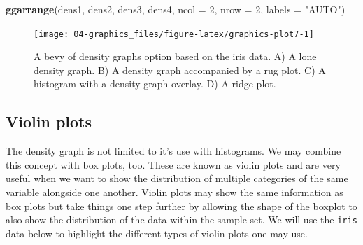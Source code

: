 \documentclass[english,10pt,a4paper,oneside]{book}
\newenvironment{Shaded}{\begin{snugshade}}{\end{snugshade}}
\newcommand{\KeywordTok}[1]{\textcolor[rgb]{0.13,0.29,0.53}{\textbf{#1}}}
\newcommand{\DataTypeTok}[1]{\textcolor[rgb]{0.13,0.29,0.53}{#1}}
\newcommand{\DecValTok}[1]{\textcolor[rgb]{0.00,0.00,0.81}{#1}}
\newcommand{\StringTok}[1]{\textcolor[rgb]{0.31,0.60,0.02}{#1}}
\newcommand{\NormalTok}[1]{#1}
\theoremstyle{definition}
\theoremstyle{definition}
\theoremstyle{definition}
\theoremstyle{remark}
\begin{document}
\begin{Shaded}
\begin{Highlighting}[]
\KeywordTok{ggarrange}\NormalTok{(dens1, dens2, dens3, dens4, }\DataTypeTok{ncol =} \DecValTok{2}\NormalTok{, }\DataTypeTok{nrow =} \DecValTok{2}\NormalTok{, }\DataTypeTok{labels =} \StringTok{"AUTO"}\NormalTok{)}
\end{Highlighting}
\end{Shaded}

\begin{figure}
\texttt{[image: 04-graphics\_files/figure-latex/graphics-plot7-1]} \caption{A bevy of density graphs option based on the iris data. A) A lone density graph. B) A density graph accompanied by a rug plot. C) A histogram with a density graph overlay. D) A ridge plot.}\label{fig:graphics-plot7}
\end{figure}

\subsection{Violin plots}\label{violin-plots}

The density graph is not limited to it's use with histograms. We may
combine this concept with box plots, too. These are known as violin
plots and are very useful when we want to show the distribution of
multiple categories of the same variable alongside one another. Violin
plots may show the same information as box plots but take things one
step further by allowing the shape of the boxplot to also show the
distribution of the data within the sample set. We will use the
\texttt{iris} data below to highlight the different types of violin
plots one may use.
\end{document}
